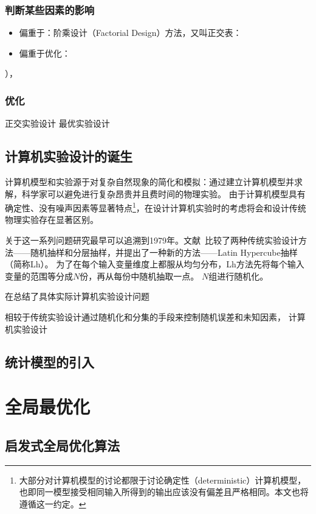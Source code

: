 \documentclass[index]{subfiles}
\begin{document}
\subsubsection{判断某些因素的影响}
\begin{itemize}
  \item 偏重于：阶乘设计（Factorial Design）方法，又叫正交表\cite{刘瑞江2010}：
  \item 偏重于优化：
\end{itemize}
），

\subsubsection{优化}

正交实验设计
最优实验设计

\subsection{计算机实验设计的诞生}
计算机模型和实验源于对复杂自然现象的简化和模拟：通过建立计算机模型并求解，科学家可以避免进行复杂昂贵并且费时间的物理实验。
由于计算机模型具有确定性、没有噪声因素等显著特点\footnote{大部分对计算机模型的讨论都限于讨论确定性（deterministic）计算机模型，也即同一模型接受相同输入所得到的输出应该没有偏差且严格相同。本文也将遵循这一约定。}，在设计计算机实验时的考虑将会和设计传统物理实验存在显著区别。\cite{sacks1989}


关于这一系列问题研究最早可以追溯到1979年。文献~比较了两种传统实验设计方法——随机抽样和分层抽样，并提出了一种新的方法——Latin Hypercube抽样（简称Lh）。
为了在每个输入变量维度上都服从均匀分布，Lh方法先将每个输入变量的范围等分成$N$份，再从每份中随机抽取一点。
$N$组进行随机化。

在总结了具体实际计算机实验设计问题

相较于传统实验设计通过随机化和分集的手段来控制随机误差和未知因素，
计算机实验设计\cite{mckay1979,sacks1989}
\subsection{统计模型的引入}
\section{全局最优化}
\subsection{启发式全局优化算法}
\end{document}

